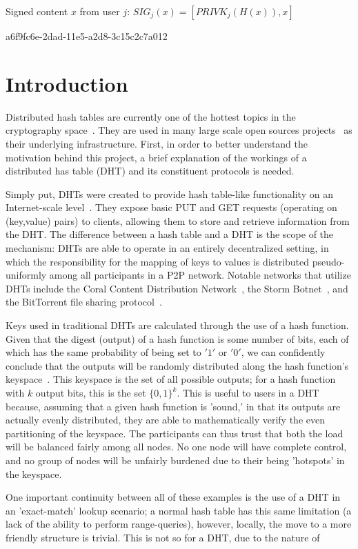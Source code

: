 \documentclass[12pt]{article}
\begin{document}
Signed content $x$ from user $j$: $SIG_j(x) = \left[ PRIVK_j( H(x) ), x \right]$

a6f9fc6e-2dad-11e5-a2d8-3c15c2c7a012\section{Introduction}
\par Distributed hash tables are currently one of the hottest topics in the cryptography space~\cite{Stoica:2001dj,Rowstron:2001ea,Ratnasamy:2001wn}. They are used in many large scale open sources projects~\cite{Freitas:2013tb,Xu:2010vs,Perfitt:2010fh} as their underlying infrastructure. First, in order to better understand the motivation behind this project, a brief explanation of the workings of a distributed has table (DHT) and its constituent protocols is needed.

\par Simply put, DHTs were created to provide hash table-like functionality on an Internet-scale level~\cite{Ratnasamy:2001wn}. They expose basic PUT and GET requests (operating on (key,value) pairs) to clients, allowing them to store and retrieve information from the DHT. The difference between a hash table and a DHT is the scope of the mechanism: DHTs are able to operate in an entirely decentralized setting, in which the responsibility for the mapping of keys to values is distributed pseudo-uniformly among all participants in a P2P network. Notable networks that utilize DHTs include the Coral Content Distribution Network~\cite{Freedman:2004vb}, the Storm Botnet~\cite{Holz:2008uk}, and the BitTorrent file sharing protocol~\cite{Cohen:y1_8mBnw}.

\par Keys used in traditional DHTs are calculated through the use of a hash function. Given that the digest (output) of a hash function is some number of bits, each of which has the same probability of being set to $'1'$ or $'0'$, we can confidently conclude that the outputs will be randomly distributed along the hash function's keyspace~. This keyspace is the set of all possible outputs; for a hash function with $k$ output bits, this is the set $\{0,1\}^k$. This is useful to users in a DHT because, assuming that a given hash function is 'sound,' in that its outputs are actually evenly distributed, they are able to mathematically verify the even partitioning of the keyspace. The participants can thus trust that both the load will be balanced fairly among all nodes. No one node will have complete control, and no group of nodes will be unfairly burdened due to their being 'hotspots' in the keyspace.~

\par One important continuity between all of these examples is the use of a DHT in an 'exact-match' lookup scenario; a normal hash table has this same limitation (a lack of the ability to perform range-queries), however, locally, the move to a more friendly structure is trivial. This is not so for a DHT, due to the nature of
\printbibliography
\end{document}
